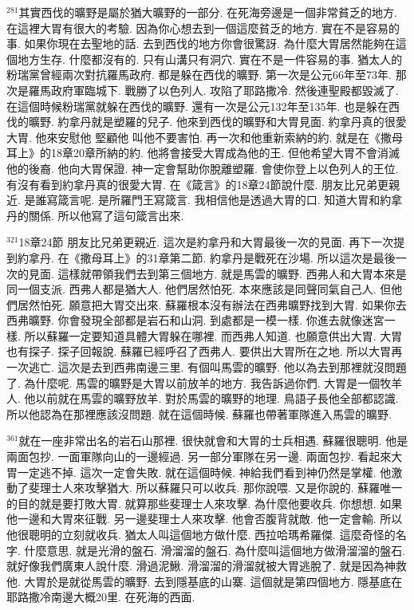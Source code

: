 \documentclass{book}
\begin{document}
$^{281}$其實西伐的曠野是屬於猶大曠野的一部分.
在死海旁邊是一個非常貧乏的地方.
在這裡大胃有很大的考驗.
因為你心想去到一個這麼貧乏的地方.
實在不是容易的事.
如果你現在去聖地的話.
去到西伐的地方你會很驚訝.
為什麼大胃居然能夠在這個地方生存.
什麼都沒有的.
只有山溝只有洞穴.
實在不是一件容易的事.
猶太人的粉瑞黨曾經兩次對抗羅馬政府.
都是躲在西伐的曠野.
第一次是公元66年至73年.
那次是羅馬政府軍臨城下.
戰勝了以色列人.
攻陷了耶路撒冷.
然後連聖殿都毀滅了.
在這個時候粉瑞黨就躲在西伐的曠野.
還有一次是公元132年至135年.
也是躲在西伐的曠野.
約拿丹就是塑羅的兒子.
他來到西伐的曠野和大胃見面.
約拿丹真的很愛大胃.
他來安慰他 堅顧他 叫他不要害怕.
再一次和他重新索納的約.
就是在《撒母耳上》的18章20章所納的約.
他將會接受大胃成為他的王.
但他希望大胃不會消滅他的後裔.
他向大胃保證.
神一定會幫助你脫離塑羅.
會使你登上以色列人的王位.
有沒有看到約拿丹真的很愛大胃.
在《箴言》的18章24節說什麼.
朋友比兄弟更親近.
是誰寫箴言呢.
是所羅門王寫箴言.
我相信他是透過大胃的口.
知道大胃和約拿丹的關係.
所以他寫了這句箴言出來.

$^{321}$18章24節 朋友比兄弟更親近.
這次是約拿丹和大胃最後一次的見面.
再下一次提到約拿丹.
在《撒母耳上》的31章第二節.
約拿丹是戰死在沙場.
所以這次是最後一次的見面.
這樣就帶領我們去到第三個地方.
就是馬雲的曠野.
西弗人和大胃本來是同一個支派.
西弗人都是猶大人.
他們居然怕死.
本來應該是同聲同氣自己人.
但他們居然怕死.
願意把大胃交出來.
蘇羅根本沒有辦法在西弗曠野找到大胃.
如果你去西弗曠野.
你會發現全部都是岩石和山洞.
到處都是一模一樣.
你進去就像迷宮一樣.
所以蘇羅一定要知道具體大胃躲在哪裡.
而西弗人知道.
也願意供出大胃.
大胃也有探子.
探子回報說.
蘇羅已經呼召了西弗人.
要供出大胃所在之地.
所以大胃再一次逃亡.
這次是去到西弗南邊三里.
有個叫馬雲的曠野.
他以為去到那裡就沒問題了.
為什麼呢.
馬雲的曠野是大胃以前放羊的地方.
我告訴過你們.
大胃是一個牧羊人.
他以前就在馬雲的曠野放羊.
對於馬雲的曠野的地理.
鳥語子長他全部都認識.
所以他認為在那裡應該沒問題.
就在這個時候.
蘇羅也帶著軍隊進入馬雲的曠野.

$^{361}$就在一座非常出名的岩石山那裡.
很快就會和大胃的士兵相遇.
蘇羅很聰明.
他是兩面包抄.
一面軍隊向山的一邊經過.
另一部分軍隊在另一邊.
兩面包抄.
看起來大胃一定逃不掉.
這次一定會失敗.
就在這個時候.
神給我們看到神仍然是掌權.
他激動了斐理士人來攻擊猶大.
所以蘇羅只可以收兵.
那你說喂.
又是你說的.
蘇羅唯一的目的就是要打敗大胃.
就算那些斐理士人來攻擊.
為什麼他要收兵.
你想想.
如果他一邊和大胃來征戰.
另一邊斐理士人來攻擊.
他會否腹背就敵.
他一定會輸.
所以他很聰明的立刻就收兵.
猶太人叫這個地方做什麼.
西拉哈瑪希羅傑.
這麼奇怪的名字.
什麼意思.
就是光滑的盤石.
滑溜溜的盤石.
為什麼叫這個地方做滑溜溜的盤石.
就好像我們廣東人說什麼.
滑過泥鰍.
滑溜溜的滑溜就被大胃逃脫了.
就是因為神救他.
大胃於是就從馬雲的曠野.
去到隱基底的山寨.
這個就是第四個地方.
隱基底在耶路撒冷南邊大概20里.
在死海的西面.
\end{document}
